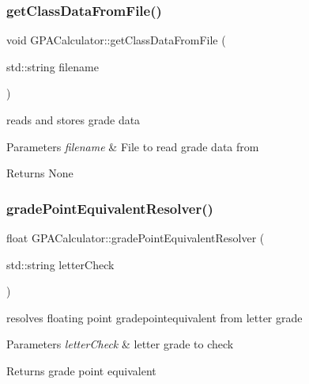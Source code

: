 \subsubsection{\texorpdfstring{get\+Class\+Data\+From\+File()}{getClassDataFromFile()}}
{\footnotesize\ttfamily void G\+P\+A\+Calculator\+::get\+Class\+Data\+From\+File (\begin{DoxyParamCaption}\item[{std\+::string}]{filename }\end{DoxyParamCaption})\hspace{0.3cm}{\ttfamily [private]}}



reads and stores grade data 


\begin{DoxyParams}{Parameters}
{\em filename} & File to read grade data from \\
\hline
\end{DoxyParams}
\begin{DoxyReturn}{Returns}
None 
\end{DoxyReturn}
\mbox{\label{class_g_p_a_calculator_aab6e4bedfe1131f9a5d3984ca03720c1}} 
\subsubsection{\texorpdfstring{grade\+Point\+Equivalent\+Resolver()}{gradePointEquivalentResolver()}}
{\footnotesize\ttfamily float G\+P\+A\+Calculator\+::grade\+Point\+Equivalent\+Resolver (\begin{DoxyParamCaption}\item[{std\+::string}]{letter\+Check }\end{DoxyParamCaption})\hspace{0.3cm}{\ttfamily [private]}}



resolves floating point gradepointequivalent from letter grade 


\begin{DoxyParams}{Parameters}
{\em letter\+Check} & letter grade to check \\
\hline
\end{DoxyParams}
\begin{DoxyReturn}{Returns}
grade point equivalent 
\end{DoxyReturn}
\mbox{\label{class_g_p_a_calculator_acadc3a8b84d397760ba90706f4eda0ba}} 
